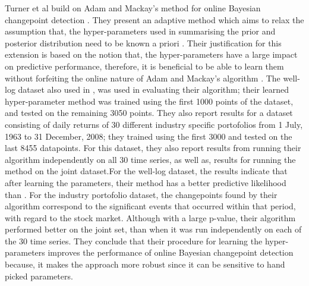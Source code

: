 \documentclass[13pt]{report}
\begin{document}
Turner et al build on Adam and Mackay's method for online Bayesian changepoint detection \cite{adams2007bayesian}. They present an adaptive method which aims to relax the assumption that, the hyper-parameters used in summarising the prior and posterior distribution need to be known a priori \cite{turner2009adaptive}. Their justification for this extension is based on the notion that, the hyper-parameters have a large impact on predictive performance, therefore, it is beneficial to be able to learn them without forfeiting the online nature of Adam and Mackay's algorithm \cite{turner2009adaptive}. The well-log dataset also used in \cite{adams2007bayesian}, was used in evaluating their algorithm; their learned hyper-parameter method was trained using the first 1000 points of the dataset, and tested on the remaining 3050 points. They also report results for a dataset consisting of daily returns of 30 different industry specific portofolios from 1 July, 1963 to 31 December, 2008; they trained using the first 3000 and tested on the last 8455 datapoints. For this dataset, they also report results from running their algorithm independently on all 30 time series, as well as, results for running the method on the joint dataset.For the well-log dataset, the results indicate that after learning the parameters, their method has a better predictive likelihood than \cite{adams2007bayesian}. For the industry portofolio dataset, the changepoints found by their algorithm correspond to the significant events that occurred within that period, with regard to the stock market\cite{turner2009adaptive}. Although with a large p-value, their algorithm performed better on the joint set, than when it was run independently on each of the 30 time series. They conclude that their procedure for learning the hyper-parameters  improves the performance of online Bayesian changepoint detection because, it makes the approach more robust since it can be sensitive to hand picked parameters\cite{turner2009adaptive}.
\end{document}
